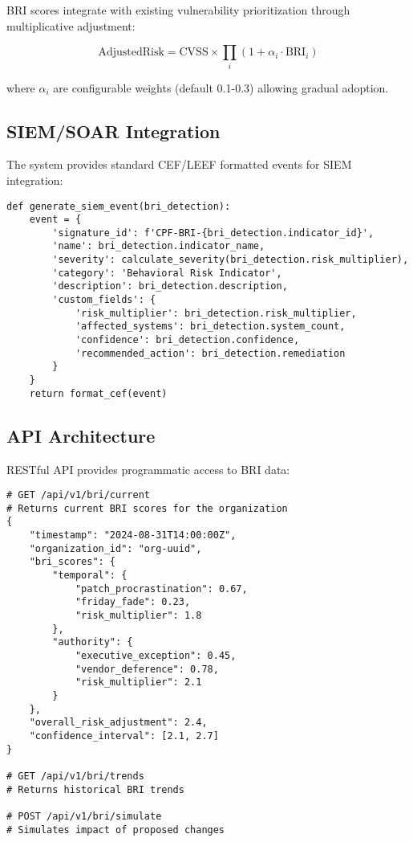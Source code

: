 \documentclass[11pt,a4paper]{article}
\begin{document}
BRI scores integrate with existing vulnerability prioritization through multiplicative adjustment:

\begin{equation}
\text{AdjustedRisk} = \text{CVSS} \times \prod_{i} (1 + \alpha_i \cdot \text{BRI}_i)
\end{equation}

where $\alpha_i$ are configurable weights (default 0.1-0.3) allowing gradual adoption.

\subsection{SIEM/SOAR Integration}

The system provides standard CEF/LEEF formatted events for SIEM integration:

\begin{lstlisting}[caption={SIEM Event Generation}]
def generate_siem_event(bri_detection):
    event = {
        'signature_id': f'CPF-BRI-{bri_detection.indicator_id}',
        'name': bri_detection.indicator_name,
        'severity': calculate_severity(bri_detection.risk_multiplier),
        'category': 'Behavioral Risk Indicator',
        'description': bri_detection.description,
        'custom_fields': {
            'risk_multiplier': bri_detection.risk_multiplier,
            'affected_systems': bri_detection.system_count,
            'confidence': bri_detection.confidence,
            'recommended_action': bri_detection.remediation
        }
    }
    return format_cef(event)
\end{lstlisting}

\subsection{API Architecture}

RESTful API provides programmatic access to BRI data:

\begin{lstlisting}[caption={BRI API Endpoints}]
# GET /api/v1/bri/current
# Returns current BRI scores for the organization
{
    "timestamp": "2024-08-31T14:00:00Z",
    "organization_id": "org-uuid",
    "bri_scores": {
        "temporal": {
            "patch_procrastination": 0.67,
            "friday_fade": 0.23,
            "risk_multiplier": 1.8
        },
        "authority": {
            "executive_exception": 0.45,
            "vendor_deference": 0.78,
            "risk_multiplier": 2.1
        }
    },
    "overall_risk_adjustment": 2.4,
    "confidence_interval": [2.1, 2.7]
}

# GET /api/v1/bri/trends
# Returns historical BRI trends

# POST /api/v1/bri/simulate
# Simulates impact of proposed changes
\end{lstlisting}
\end{document}
